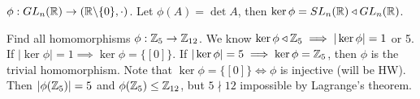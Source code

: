 \documentclass[]{article}
\begin{document}
\begin{example}
	$\phi:GL_n(\mathbb{R})\rightarrow(\mathbb{R}\backslash\{0\},\cdot)$.
	Let $\phi(A) = \det A$, then $\ker\phi = SL_n(\mathbb{R}) \triangleleft GL_n(\mathbb{R})$.
\end{example}
\begin{example}
	Find all homomorphisms $\phi:\mathbb{Z}_5\rightarrow\mathbb{Z}_{12}$.
	We know $\ker\phi\triangleleft\mathbb{Z}_5\implies |\ker\phi| = 1$ or 5.
	If $|\ker\phi| = 1 \implies \ker\phi = \{[0]\}$. If $|\ker\phi| = 5\implies \ker\phi = \mathbb{Z}_5$, then $\phi$ is the trivial homomorphism.
	Note that $\ker\phi = \{[0]\}\iff\phi$ is injective (will be HW). Then $|\phi(\mathbb{Z}_5)| = 5$ and $\phi(\mathbb{Z}_5)\leq\mathbb{Z}_{12}$, but $5\nmid 12$ impossible by Lagrange's theorem.
\end{example}
\end{document}

